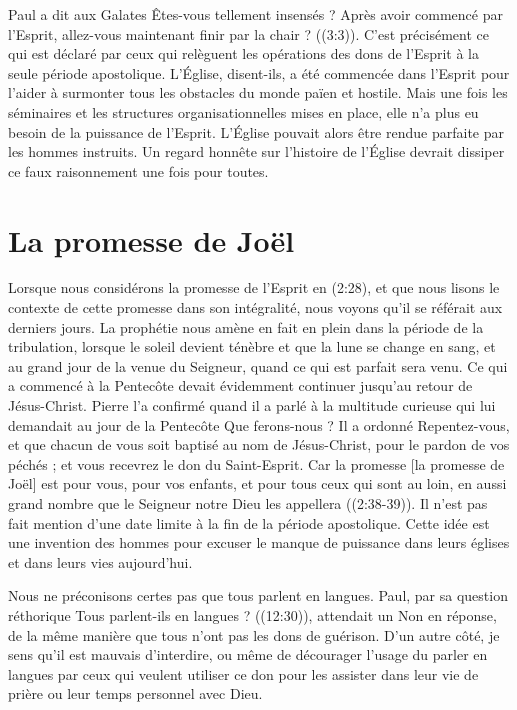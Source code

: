 Paul a dit aux Galates\frcolon{} \Og Êtes-vous tellement insensés ?
 Après avoir commencé par l'Esprit, allez-vous maintenant finir
 par la chair ? \Fg{} ((3:3)).
 C'est précisément ce qui est déclaré par ceux qui relèguent
 les opérations des dons de l'Esprit à la seule période apostolique.
 L'Église, disent-ils, a été commencée dans l'Esprit pour l'aider
 à surmonter tous les obstacles du monde païen et hostile.
 Mais une fois les séminaires et les structures organisationnelles
 mises en place, elle n'a plus eu besoin de la puissance de l'Esprit.
 L'Église pouvait alors être rendue parfaite par les hommes instruits.
 Un regard honnête sur l'histoire de l'Église devrait dissiper
 ce faux raisonnement une fois pour toutes.


\section{La promesse de Jo\"el}

Lorsque nous considérons la promesse de l'Esprit en (2:28),
 et que nous lisons le contexte de cette promesse dans son intégralité,
 nous voyons qu'il se référait aux derniers jours.
 La prophétie nous amène en fait en plein dans la période de la tribulation,
 lorsque le soleil devient ténèbre et que la lune se change en sang,
 et au grand jour de la venue du Seigneur, quand ce qui est parfait sera venu.
 Ce qui a commencé à la Pentecôte devait évidemment continuer jusqu'au retour
 de Jésus-Christ. Pierre l'a confirmé quand il a parlé à la multitude curieuse
 qui lui demandait au jour de la Pentecôte\frcolon{} \Og Que ferons-nous ? \Fg{}
 Il a ordonné\frcolon{} \Og Repentez-vous, et que chacun de vous soit baptisé
 au nom de Jésus-Christ, pour le pardon de vos péchés ;
 et vous recevrez le don du Saint-Esprit. Car la promesse
 [la promesse de Joël] est pour vous, pour vos enfants,
 et pour tous ceux qui sont au loin, en aussi grand nombre
 que le Seigneur notre Dieu les appellera \Fg{} ((2:38-39)).
 Il n'est pas fait mention d'une date limite à la fin de la période
 apostolique. Cette idée est une invention des hommes pour excuser
 le manque de puissance dans leurs églises et dans leurs vies aujourd'hui.

Nous ne préconisons certes pas que tous parlent en langues.
 Paul, par sa question réthorique\frcolon{} \Og Tous parlent-ils en langues ? \Fg{}
 ((12:30)), attendait un \Og Non \Fg{} en réponse,
 de la même manière que tous n'ont pas les dons de guérison.
 D'un autre côté, je sens qu'il est mauvais d'interdire,
 ou même de décourager l'usage du parler en langues par ceux
 qui veulent utiliser ce don pour les assister dans leur vie
 de prière ou leur temps personnel avec Dieu.
\closechapter

